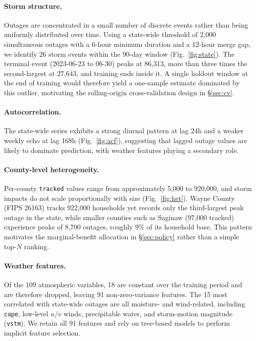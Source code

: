 \documentclass[11pt]{article}
\begin{document}
\paragraph{Storm structure.}
Outages are concentrated in a small number of discrete events rather than being uniformly distributed over time. Using a state-wide threshold of 2{,}000 simultaneous outages with a 6-hour minimum duration and a 12-hour merge gap, we identify 26 storm events within the 90-day window (Fig.~\ref{fig:state}). The terminal event (2023-06-23 to 06-30) peaks at 86{,}313, more than three times the second-largest at 27{,}643, and training ends inside it. A single holdout window at the end of training would therefore yield a one-sample estimate dominated by this outlier, motivating the rolling-origin cross-validation design in \S\ref{sec:cv}.

\paragraph{Autocorrelation.}
The state-wide series exhibits a strong diurnal pattern at lag 24h and a
weaker weekly echo at lag 168h (Fig.~\ref{fig:acf}), suggesting that
lagged outage values are likely to dominate prediction, with weather features playing a secondary role.

\paragraph{County-level heterogeneity.}
Per-county \texttt{tracked} values range from approximately 5{,}000 to 920{,}000, and storm impacts do not scale proportionally with size (Fig.~\ref{fig:het}). Wayne County (FIPS 26163) tracks 922{,}000 households yet records only the third-largest peak outage in the state, while smaller counties such as Saginaw (97{,}000 tracked) experience peaks of 8{,}700 outages, roughly 9\% of its household base. This pattern motivates the marginal-benefit allocation in \S\ref{sec:policy} rather than a simple top-$N$ ranking.

\paragraph{Weather features.}
Of the 109 atmospheric variables, 18 are constant over the training period and are therefore dropped, leaving 91 non-zero-variance features. The 15 most correlated with state-wide outages are all moisture- and wind-related, including \texttt{cape}, low-level $u/v$ winds, precipitable water, and storm-motion magnitude (\texttt{vstm}). We retain all 91 features and rely on tree-based models to perform implicit feature selection.
\end{document}
